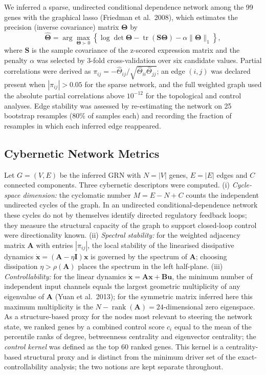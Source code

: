 \documentclass[12pt]{article}
\begin{document}
We inferred a sparse, undirected conditional dependence network among the 99
genes with the graphical lasso (Friedman et al.\ 2008), which estimates the
precision (inverse covariance) matrix $\boldsymbol{\Theta}$ by
\begin{equation}
\hat{\boldsymbol{\Theta}} = \arg\max_{\boldsymbol{\Theta}\succ 0}
\left\{ \log\det\boldsymbol{\Theta} - \operatorname{tr}
(\mathbf{S}\boldsymbol{\Theta}) - \alpha\|\boldsymbol{\Theta}\|_1 \right\},
\end{equation}
where $\mathbf{S}$ is the sample covariance of the z-scored expression
matrix and the penalty $\alpha$ was selected by 3-fold cross-validation
over six candidate values. Partial correlations were derived as
$\pi_{ij} = -\hat{\Theta}_{ij}/\sqrt{\hat{\Theta}_{ii}\hat{\Theta}_{jj}}$;
an edge $(i,j)$ was declared present when $|\pi_{ij}| > 0.05$ for the sparse
network, and the full weighted graph used the absolute partial correlations
above $10^{-12}$ for the topological and control analyses. Edge stability
was assessed by re-estimating the network on 25 bootstrap resamples (80\% of
samples each) and recording the fraction of resamples in which each inferred
edge reappeared.

\subsection{Cybernetic Network Metrics}

Let $G=(V,E)$ be the inferred GRN with $N=|V|$ genes, $E=|E|$ edges and $C$
connected components. Three cybernetic descriptors were computed.
(i) \emph{Cycle-space dimension:} the cyclomatic number $M = E - N + C$
counts the independent undirected cycles of the graph. In an undirected
conditional-dependence network these cycles do not by themselves identify
directed regulatory feedback loops; they measure the structural capacity of
the graph to support closed-loop control were directionality known.
(ii) \emph{Spectral stability:} for the weighted adjacency matrix
$\mathbf{A}$ with entries $|\pi_{ij}|$, the local stability of the
linearised dissipative dynamics $\dot{\mathbf{x}} = (\mathbf{A} -
\eta\mathbf{I})\mathbf{x}$ is governed by the spectrum of $\mathbf{A}$;
choosing dissipation $\eta > \rho(\mathbf{A})$ places the spectrum in the
left half-plane. (iii) \emph{Controllability:} for the linear dynamics
$\dot{\mathbf{x}} = \mathbf{A}\mathbf{x} + \mathbf{B}\mathbf{u}$, the
minimum number of independent input channels equals the largest geometric
multiplicity of any eigenvalue of $\mathbf{A}$ (Yuan et al.\ 2013); for the
symmetric matrix inferred here this maximum multiplicity is the
$N - \operatorname{rank}(\mathbf{A}) = 24$-dimensional zero eigenspace. As a structure-based proxy for the nodes most relevant
to steering the network state, we ranked genes by a combined control score
$c_i$ equal to the mean of the percentile ranks of degree, betweenness
centrality and eigenvector centrality; the \emph{control kernel} was defined
as the top 60 ranked genes. This kernel is a centrality-based structural
proxy and is distinct from the minimum driver set of the exact-controllability
analysis; the two notions are kept separate throughout.
\end{document}
